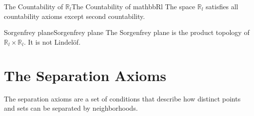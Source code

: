 \documentclass[../main.tex]{subfiles}
\begin{document}
\begin{example}{The Countability of $\mathbb{R}_l$}{The Countability of mathbbRl}
	The space $\mathbb{R}_l$ satisfies all countability axioms except second countability.
\end{example}

\begin{example}{Sorgenfrey plane}{Sorgenfrey plane}
	The Sorgenfrey plane is the product topology of $\mathbb{R}_l \times \mathbb{R}_l$. It is not Lindel\"of.
\end{example}

\section{The Separation Axioms}
The separation axioms are a set of conditions that describe how distinct points and sets can be separated by neighborhoods.
\end{document}
